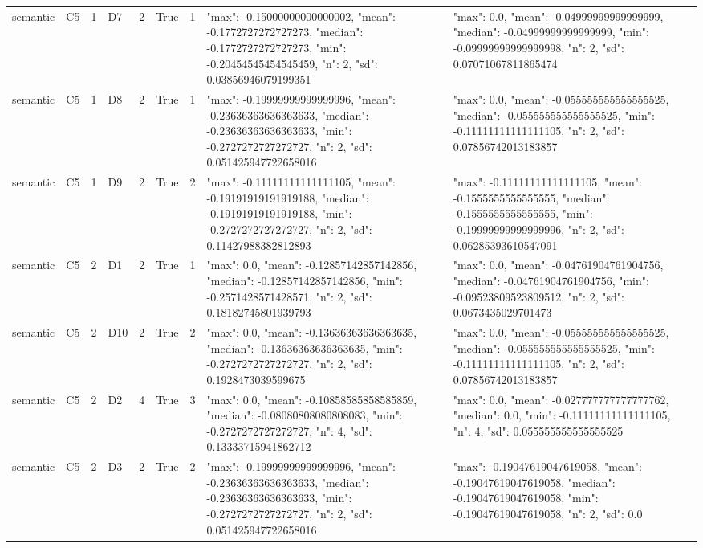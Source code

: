 \begin{tabular}{lllllllll}
semantic & C5 & 1 & D7 & 2 & True & 1 & {"max": -0.15000000000000002, "mean": -0.1772727272727273, "median": -0.1772727272727273, "min": -0.20454545454545459, "n": 2, "sd": 0.03856946079199351} & {"max": 0.0, "mean": -0.04999999999999999, "median": -0.04999999999999999, "min": -0.09999999999999998, "n": 2, "sd": 0.07071067811865474} \\
semantic & C5 & 1 & D8 & 2 & True & 1 & {"max": -0.19999999999999996, "mean": -0.23636363636363633, "median": -0.23636363636363633, "min": -0.2727272727272727, "n": 2, "sd": 0.051425947722658016} & {"max": 0.0, "mean": -0.055555555555555525, "median": -0.055555555555555525, "min": -0.11111111111111105, "n": 2, "sd": 0.07856742013183857} \\
semantic & C5 & 1 & D9 & 2 & True & 2 & {"max": -0.11111111111111105, "mean": -0.19191919191919188, "median": -0.19191919191919188, "min": -0.2727272727272727, "n": 2, "sd": 0.11427988382812893} & {"max": -0.11111111111111105, "mean": -0.1555555555555555, "median": -0.1555555555555555, "min": -0.19999999999999996, "n": 2, "sd": 0.06285393610547091} \\
semantic & C5 & 2 & D1 & 2 & True & 1 & {"max": 0.0, "mean": -0.12857142857142856, "median": -0.12857142857142856, "min": -0.2571428571428571, "n": 2, "sd": 0.18182745801939793} & {"max": 0.0, "mean": -0.04761904761904756, "median": -0.04761904761904756, "min": -0.09523809523809512, "n": 2, "sd": 0.0673435029701473} \\
semantic & C5 & 2 & D10 & 2 & True & 2 & {"max": 0.0, "mean": -0.13636363636363635, "median": -0.13636363636363635, "min": -0.2727272727272727, "n": 2, "sd": 0.1928473039599675} & {"max": 0.0, "mean": -0.055555555555555525, "median": -0.055555555555555525, "min": -0.11111111111111105, "n": 2, "sd": 0.07856742013183857} \\
semantic & C5 & 2 & D2 & 4 & True & 3 & {"max": 0.0, "mean": -0.10858585858585859, "median": -0.08080808080808083, "min": -0.2727272727272727, "n": 4, "sd": 0.13333715941862712} & {"max": 0.0, "mean": -0.027777777777777762, "median": 0.0, "min": -0.11111111111111105, "n": 4, "sd": 0.055555555555555525} \\
semantic & C5 & 2 & D3 & 2 & True & 2 & {"max": -0.19999999999999996, "mean": -0.23636363636363633, "median": -0.23636363636363633, "min": -0.2727272727272727, "n": 2, "sd": 0.051425947722658016} & {"max": -0.19047619047619058, "mean": -0.19047619047619058, "median": -0.19047619047619058, "min": -0.19047619047619058, "n": 2, "sd": 0.0} \\

\end{tabular}
